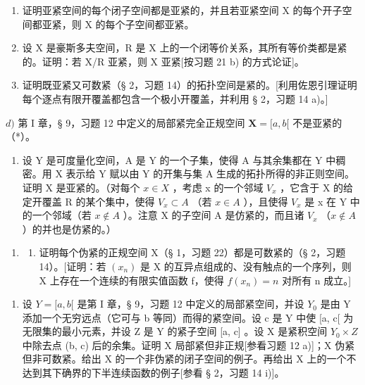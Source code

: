 \begin{enumerate}
\def\labelenumi{\alph{enumi})}
\item
  证明亚紧空间的每个闭子空间都是亚紧的，并且若亚紧空间 X 的每个开子空间都亚紧，则 X 的每个子空间都亚紧。
\item
  设 X 是豪斯多夫空间，R 是 X 上的一个闭等价关系，其所有等价类都是紧的。证明：若 X/R 亚紧，则 X 亚紧{[}按习题 21 b) 的方式论证{]}。
\item
  证明既亚紧又可数紧（§ 2，习题 14）的拓扑空间是紧的。{[}利用佐恩引理证明每个逐点有限开覆盖都包含一个极小开覆盖，并利用 § 2，习题 14 a)。{]}
\end{enumerate}

\(d)\) 第 I 章，§ 9，习题 12 中定义的局部紧完全正规空间 \(\mathbf{X} = [a, b[\) 不是亚紧的（*）。

\begin{enumerate}
\def\labelenumi{\alph{enumi})}
\setcounter{enumi}{4}
\tightlist
\item
  设 Y 是可度量化空间，A 是 Y 的一个子集，使得 A 与其余集都在 Y 中稠密。用 X 表示给 Y 赋以由 Y 的开集与集 A 生成的拓扑所得的非正则空间。证明 X 是亚紧的。（对每个 \(x \in X\) ，考虑 x 的一个邻域 \(V_{x}\) ，它含于 X 的给定开覆盖 R 的某个集中，使得 \(V_{x} \subset A\) （若 \(x \in A\) ），且使得 \(V_{x}\) 是 x 在 Y 中的一个邻域（若 \(x \notin A\) ）。注意 X 的子空间 A 是仿紧的，而且诸 \(V_{x}\) （\(x \notin A\) ）的并也是仿紧的。）
\end{enumerate}

\begin{enumerate}
\def\labelenumi{\arabic{enumi})}
\setcounter{enumi}{25}
\tightlist
\item
  \begin{enumerate}
  \def\labelenumii{\alph{enumii})}
  \tightlist
  \item
    证明每个伪紧的正规空间 X（§ 1，习题 22）都是可数紧的（§ 2，习题 14）。{[}证明：若 \((x_n)\) 是 X 的互异点组成的、没有触点的一个序列，则 X 上存在一个连续的有限实值函数 f，使得 \(f(x_n) = n\) 对所有 n 成立。{]}
  \end{enumerate}
\end{enumerate}

\begin{enumerate}
\def\labelenumi{\alph{enumi})}
\setcounter{enumi}{1}
\tightlist
\item
  设 \(Y = [a, b[\) 是第 I 章，§ 9，习题 12 中定义的局部紧空间，并设 \(Y_{0}\) 是由 Y 添加一个无穷远点（它可与 b 等同）而得的紧空间。设 c 是 Y 中使 {[}a, c{[} 为无限集的最小元素，并设 Z 是 Y 的紧子空间 {[}a, c{]} 。设 X 是紧积空间 \(Y_{0} \times Z\) 中除去点 (b, c) 后的余集。证明 X 局部紧但非正规{[}参看习题 12 a){]}；X 伪紧但非可数紧。给出 X 的一个非伪紧的闭子空间的例子。再给出 X 上的一个不达到其下确界的下半连续函数的例子{[}参看 § 2，习题 14 i){]}。
\end{enumerate}

